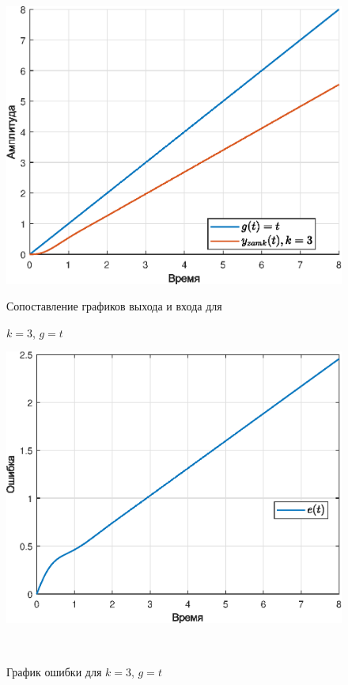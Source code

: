 \documentclass[a4paper]{article}
\begin{document}
\begin{figure}[H]
    \begin{minipage}{0.5\textwidth}
        \centering \includegraphics[width=\textwidth]{ex3/k3_g_vt.eps}
        \caption{Сопоставление графиков выхода и входа для}
        \centerline{$k=3$, $g=t$}
    \end{minipage}\hfill
    \begin{minipage}{0.5\textwidth}
        \centering \includegraphics[width=\textwidth]{ex3/k3_g_vt_error.eps}
        \caption{График ошибки для $k=3$, $g=t$}
    \end{minipage}\\[1em]
\end{figure}\noindent\
\end{document}
